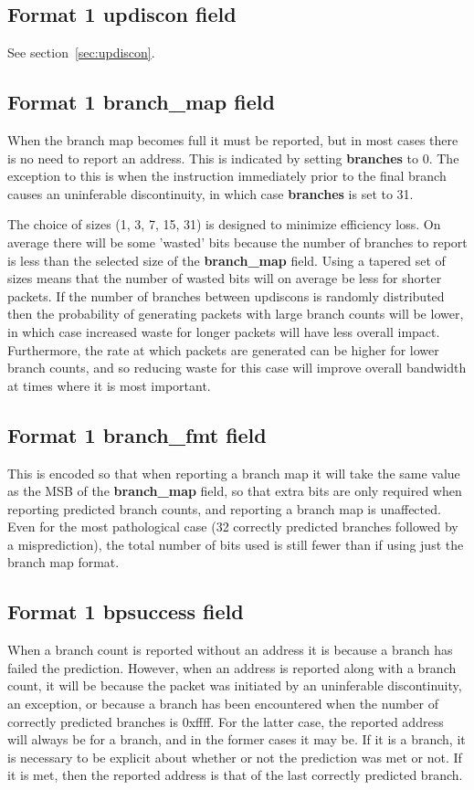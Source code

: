 \subsection{Format 1 \textbf{updiscon} field}

See section~\ref{sec:updiscon}.

\subsection{Format 1 \textbf{branch\_map} field}
When the branch map becomes full it must be reported, but in most cases there is no need to report an address.
This is indicated by setting \textbf{branches} to 0.  The exception to this is when the instruction immediately prior to 
the final branch causes an uninferable discontinuity, in which case \textbf{branches} is set to 31.

The choice of sizes (1, 3, 7, 15, 31) is designed to minimize efficiency loss.  On average there will be some 'wasted' bits 
because the number of branches to report is less than the selected size of the \textbf{branch\_map} field.
Using a tapered set of sizes means that the number of wasted bits will on average be less for shorter packets.
If the number of branches between updiscons is randomly distributed then the probability of generating packets with large
branch counts will be lower, in which case increased waste for longer packets will have less overall impact.
Furthermore, the rate at which packets are generated can be higher for lower branch counts, and so reducing
waste for this case will improve overall bandwidth at times where it is most important.

\subsection{Format 1 \textbf{branch\_fmt} field}

This is encoded so that when reporting a branch map it will take the same value as the MSB of the \textbf{branch\_map} 
field, so that extra bits are only required when reporting predicted branch counts, and reporting a branch map is unaffected.  
Even for the most pathological case (32 correctly predicted branches followed by a misprediction), the total number of bits 
used is still fewer than if using just the branch map format.

\subsection{Format 1 \textbf{bpsuccess} field}
When a branch count is reported without an address it is because a branch has failed the prediction.  However, when an address is 
reported along with a branch count, it will be because the packet was initiated by an uninferable discontinuity, an exception, or 
because a branch has been encountered when the number of correctly predicted branches is 0xffff.  For the latter case, the 
reported address will always be for a branch, and in the former cases it may be.  If it is a branch, it is necessary to 
be explicit about whether or not the prediction was met or not.  If it is met, then the reported address is that of the last
correctly predicted branch.


